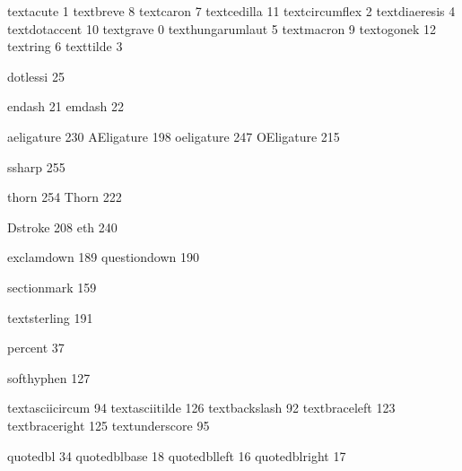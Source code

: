 
\stopmapping

\startencoding[ec][ec] %

 textacute         1
 textbreve         8
 textcaron         7
 textcedilla      11
 textcircumflex    2
 textdiaeresis     4
 textdotaccent    10
 textgrave         0
 texthungarumlaut  5
 textmacron        9
 textogonek       12
 textring          6
 texttilde         3

 dotlessi         25

 endash           21
 emdash           22

 aeligature      230
 AEligature      198
 oeligature      247
 OEligature      215

 ssharp          255

 thorn           254
 Thorn           222

 Dstroke         208
 eth             240

 exclamdown      189 %
 questiondown    190 %

 sectionmark     159

 textsterling    191

 percent          37

 softhyphen      127 %

 textasciicircum  94
 textasciitilde  126
 textbackslash    92
 textbraceleft   123
 textbraceright  125
 textunderscore   95

 quotedbl         34
 quotedblbase     18
 quotedblleft     16
 quotedblright    17

